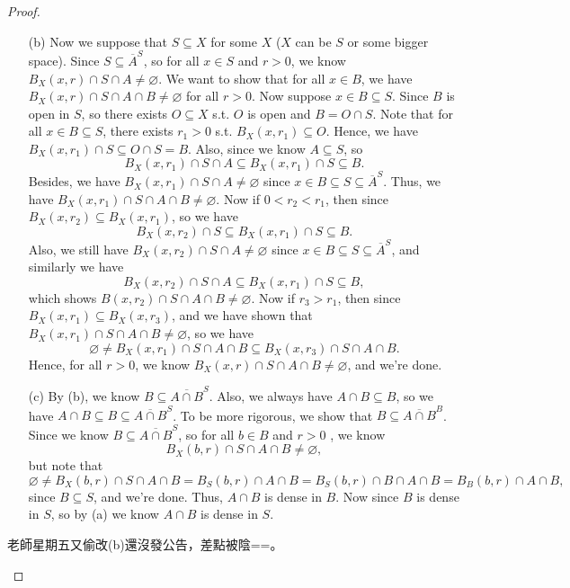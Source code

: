 \begin{proof}
\begin{itemize}
    \item [(b)] Now we suppose that \(S \subseteq X\) for some \(X\) (\(X\) can be \(S\) or some bigger space). Since \(S \subseteq \overline{A}^S \), so for all \(x \in S\) and \(r > 0\), we know \(B_X(x, r) \cap S \cap A \neq \varnothing \). We want to show that for all \(x \in B\), we have \(B_X(x, r) \cap S \cap A \cap B \neq \varnothing \) for all \(r > 0\). Now suppose \(x \in B \subseteq S\).  Since \(B\) is open in \(S\), so there exists \(O \subseteq X\) s.t. \(O\) is open and \(B = O \cap S\). Note that for all \(x \in B \subseteq S\), there exists \(r_1 > 0 \) s.t. \(B_X(x, r_1) \subseteq O\). Hence, we have \(B_X(x, r_1) \cap S \subseteq O \cap S = B\). Also, since we know \(A \subseteq S\), so 
    \[
      B_X(x, r_1) \cap S \cap A \subseteq B_X(x, r_1) \cap S \subseteq B.
    \]Besides, we have \(B_X(x, r_1) \cap S \cap A \neq \varnothing \) since \(x \in B \subseteq S \subseteq \overline{A}^S \). Thus, we have \(B_X(x, r_1) \cap S \cap A \cap B \neq \varnothing \). Now if \(0 < r_2 < r_1\), then since \(B_X(x, r_2) \subseteq B_X(x, r_1)\), so we have 
    \[
      B_X(x ,r_2) \cap S \subseteq B_X(x, r_1) \cap S \subseteq B.
    \] Also, we still have \(B_X(x, r_2) \cap S \cap A \neq \varnothing\) since \(x \in B \subseteq S \subseteq \overline{A}^S \), and similarly we have 
    \[
      B_X(x, r_2) \cap S \cap A \subseteq B_X(x, r_1) \cap S \subseteq B,
    \] which shows \(B(x, r_2) \cap S \cap A \cap B \neq \varnothing \). Now if \(r_3 > r_1\), then since \(B_X(x, r_1) \subseteq B_X(x, r_3)\), and we have shown that \(B_X(x, r_1) \cap S \cap A \cap B \neq \varnothing \), so we have 
    \[
      \varnothing \neq B_X(x, r_1) \cap S \cap A \cap B \subseteq B_X(x, r_3) \cap S \cap A \cap B.
    \]    Hence, for all \(r > 0\), we know \(B_X(x, r) \cap S \cap A \cap B \neq \varnothing \), and we're done.  
    \item [(c)] By (b), we know \(B \subseteq \overline{A \cap B}^S \). Also, we always have \(A \cap B \subseteq B\), so we have \(A \cap B \subseteq B \subseteq \overline{A \cap B}^S \). To be more rigorous, we show that \(B \subseteq \overline{A \cap B}^B \). Since we know \(B \subseteq \overline{A \cap B}^S \), so for all \(b \in B\) and \(r > 0\) , we know
    \[
      B_X(b, r) \cap S \cap A \cap B \neq \varnothing,
    \]
    but note that 
    \[
      \varnothing \neq B_X(b, r) \cap S \cap A \cap B = B_S(b, r) \cap A \cap B = B_S(b, r) \cap B \cap A \cap B = B_B(b, r) \cap A \cap B,
    \] since \(B \subseteq S\), and we're done.
    Thus, \(A \cap B\) is dense in \(B\). Now since \(B\) is dense in \(S\), so by (a) we know \(A \cap B\) is dense in \(S\).       
  \end{itemize}
  \begin{remark}
    老師星期五又偷改(b)還沒發公告，差點被陰==。
  \end{remark}
\end{proof}